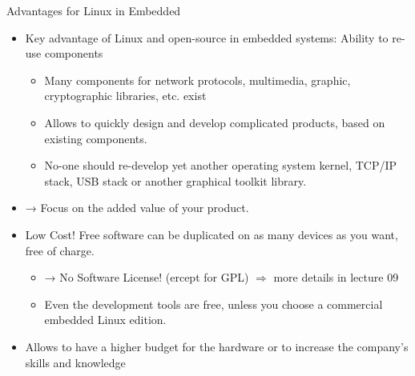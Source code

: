 \begin{concept}{Advantages for Linux in Embedded}
\begin{itemize}
    \item Key advantage of Linux and open-source in embedded systems: Ability to re-use components
    \begin{itemize}
        \item Many components for network protocols, multimedia, graphic, cryptographic libraries, etc. exist
        \item Allows to quickly design and develop complicated products, based on existing components.
        \item No-one should re-develop yet another operating system kernel, TCP/IP stack, USB stack or another graphical toolkit library.
    \end{itemize}
    \item → Focus on the added value of your product.
    \item Low Cost! Free software can be duplicated on as many devices as you want, free of charge.
    \begin{itemize}
        \item → No Software License! (ercept for GPL) $\Rightarrow$ more details in lecture 09 
        \item Even the development tools are free, unless you choose a commercial embedded Linux edition.
    \end{itemize}
    \item Allows to have a higher budget for the hardware or to increase the company's skills and knowledge
\end{itemize}
\end{concept}

